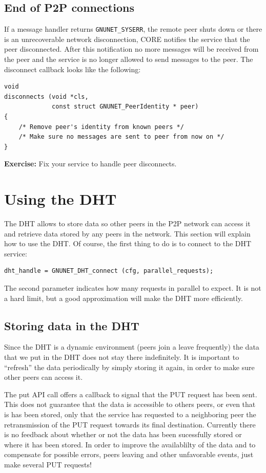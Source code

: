 \documentclass[10pt]{article}
\newcommand{\exercise}[1]{\noindent\begin{boxedminipage}{\textwidth}{\bf Exercise:} #1 \end{boxedminipage}}
\begin{document}
\subsection{End of P2P connections}

If a message handler returns {\tt GNUNET\_SYSERR}, the remote peer shuts down or
there is an unrecoverable network disconnection, CORE notifies the service that
the peer disconnected. After this notification no more messages will be received
from the peer and the service is no longer allowed to send messages to the peer.
The disconnect callback looks like the following:

\lstset{language=C}
\begin{lstlisting}
void
disconnects (void *cls,
             const struct GNUNET_PeerIdentity * peer)
{
    /* Remove peer's identity from known peers */
    /* Make sure no messages are sent to peer from now on */
}
\end{lstlisting}

\exercise{Fix your service to handle peer disconnects.}

\section{Using the DHT}
The DHT allows to store data so other peers in the P2P network can
access it and retrieve data stored by any peers in the network.
This section will explain how to use the DHT. Of course, the first
thing to do is to connect to the DHT service:
\lstset{language=C}
\begin{lstlisting}
dht_handle = GNUNET_DHT_connect (cfg, parallel_requests);
\end{lstlisting}
The second parameter indicates how many requests in parallel to expect.
It is not a hard limit, but a good approximation will make the DHT more
efficiently.

\subsection{Storing data in the DHT}
Since the DHT is a dynamic environment (peers join a leave frequently)
the data that we put in the DHT does not stay there indefinitely. It is
important to ``refresh'' the data periodically by simply storing it again,
in order to make sure other peers can access it.

The put API call offers a callback to signal that the PUT request has been
sent. This does not guarantee that the data is accessible to others peers,
or even that is has been stored, only that the service has requested to
a neighboring peer the retransmission of the PUT request towards its final
destination. Currently there is no feedback about whether or not the data
has been sucessfully stored or where it has been stored. In order to improve
the availablilty of the data and to compensate for possible errors, peers leaving
and other unfavorable events, just make several PUT requests!
\end{document}
